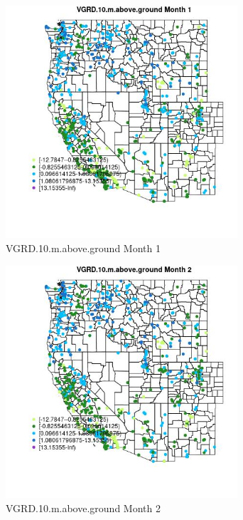\begin{figure} 
\centering  
\includegraphics[width=0.77\textwidth]{Code_Outputs/Report_ML_input_PM25_Step4_part_e_de_duplicated_aves_compiled_2019-05-21wNAs_MapObsMo1VGRD10maboveground.jpg} 
\caption{\label{fig:Report_ML_input_PM25_Step4_part_e_de_duplicated_aves_compiled_2019-05-21wNAsMapObsMo1VGRD10maboveground}VGRD.10.m.above.ground Month 1} 
\end{figure} 
 

\begin{figure} 
\centering  
\includegraphics[width=0.77\textwidth]{Code_Outputs/Report_ML_input_PM25_Step4_part_e_de_duplicated_aves_compiled_2019-05-21wNAs_MapObsMo2VGRD10maboveground.jpg} 
\caption{\label{fig:Report_ML_input_PM25_Step4_part_e_de_duplicated_aves_compiled_2019-05-21wNAsMapObsMo2VGRD10maboveground}VGRD.10.m.above.ground Month 2} 
\end{figure} 
 


